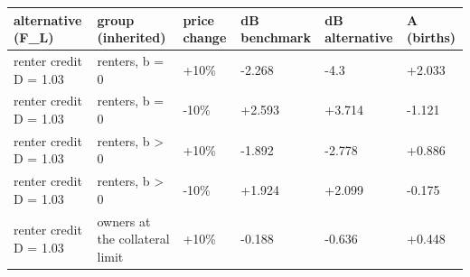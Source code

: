 \begingroup\small
\setlength{\tabcolsep}{3pt}
\renewcommand{\arraystretch}{1.04}
\begin{tabularx}{\linewidth}{XXXXXX}
\toprule
alternative (F\_L) & group (inherited) & price change & dB benchmark & dB alternative & A (births) \\
\midrule
renter credit D = 1.03 & renters, b = 0 & +10\% & -2.268 & -4.3 & +2.033 \\
renter credit D = 1.03 & renters, b = 0 & -10\% & +2.593 & +3.714 & -1.121 \\
renter credit D = 1.03 & renters, b \textgreater{} 0 & +10\% & -1.892 & -2.778 & +0.886 \\
renter credit D = 1.03 & renters, b \textgreater{} 0 & -10\% & +1.924 & +2.099 & -0.175 \\
renter credit D = 1.03 & owners at the collateral limit & +10\% & -0.188 & -0.636 & +0.448 \\
\bottomrule
\end{tabularx}
\endgroup
